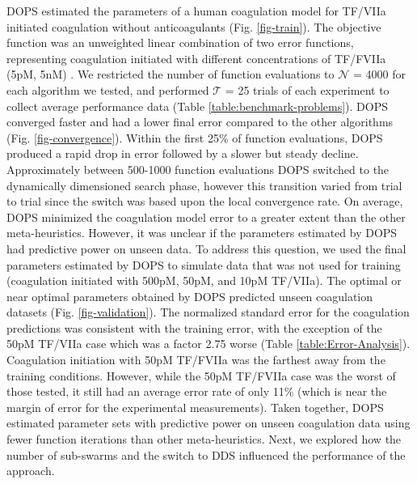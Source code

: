 \documentclass[12pt]{article}
\begin{document}
DOPS estimated the parameters of a human coagulation model for TF/VIIa initiated coagulation without anticoagulants (Fig. \ref{fig-train}).
The objective function was an unweighted linear combination of two error functions,
representing coagulation initiated with different concentrations of TF/FVIIa (5pM, 5nM) \cite{hockin2002model}.
We restricted the number of function evaluations to $\mathcal{N}$ = 4000 for each algorithm we tested, and performed $\mathcal{T}$ = 25 trials of each experiment to collect average performance data (Table \ref{table:benchmark-problems}).
DOPS converged faster and had a lower final error compared to the other algorithms (Fig. \ref{fig-convergence}).
Within the first 25\% of function evaluations, DOPS produced a rapid drop in error followed by a slower but steady decline.
Approximately between 500-1000 function evaluations DOPS switched to the dynamically dimensioned search phase, however this transition varied from trial to trial since the switch was based upon the local convergence rate.
On average, DOPS minimized the coagulation model error to a greater extent than the other meta-heuristics.
However, it was unclear if the parameters estimated by DOPS had predictive power on unseen data.
To address this question, we used the final parameters estimated by
DOPS to simulate data that was not used for training (coagulation initiated with 500pM, 50pM, and 10pM TF/VIIa).
The optimal or near optimal parameters obtained by DOPS predicted unseen coagulation datasets (Fig. \ref{fig-validation}).
The normalized standard error for the coagulation predictions was consistent with the training error, with the exception of the 50pM TF/VIIa case which was a factor 2.75 worse (Table \ref{table:Error-Analysis}).
Coagulation initiation with 50pM TF/FVIIa was the farthest away from the training conditions.
However, while the 50pM TF/FVIIa case was the worst of those tested, it still had an average error rate of only 11\% (which is near the margin of error for the experimental measurements).
Taken together, DOPS estimated parameter sets with predictive power on unseen coagulation data using fewer function iterations than other meta-heuristics.
Next, we explored how the number of sub-swarms and the switch to DDS influenced the performance of the approach.
\end{document}
